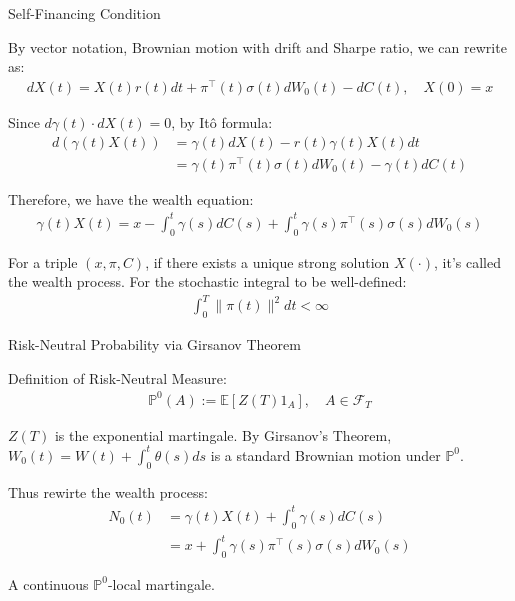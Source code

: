 \documentclass{beamer}
\begin{document}
\begin{frame}{Self-Financing Condition}

    {\footnotesize \footnotesize
    \par By vector notation, Brownian motion with drift and Sharpe ratio, we can rewrite as:
    \begin{align*}
        dX(t) = X(t)r(t)dt + \pi^\top(t)\sigma(t)dW_0(t) - dC(t), \quad X(0) = x
    \end{align*}
    \par Since $d\gamma(t) \cdot dX(t) = 0$, by Itô formula:
    \begin{align*}
        d(\gamma(t)X(t)) &= \gamma(t)dX(t) - r(t)\gamma(t)X(t)dt \\
        &= \gamma(t)\pi^\top(t)\sigma(t)dW_0(t) - \gamma(t)dC(t)
    \end{align*}
    \par Therefore, we have the wealth equation:
    \begin{align*}
        \gamma(t)X(t) = x - \int_0^t \gamma(s)dC(s) + \int_0^t \gamma(s)\pi^\top(s)\sigma(s)dW_0(s)
    \end{align*}
    \par For a triple $(x, \pi, C)$, if there exists a unique strong solution $X(\cdot)$, it's called the wealth process.
    For the stochastic integral to be well-defined:
    \begin{align*}
        \int_{0}^{T} \|\pi(t)\|^{2}  dt < \infty
    \end{align*}
    }   
\end{frame} 

\begin{frame}{Risk-Neutral Probability via Girsanov Theorem}

    {\footnotesize \footnotesize
    \par Definition of Risk-Neutral Measure:
    \begin{align*}
         \mathbb{P}^{0}(A) := \mathbb{E}[Z(T)1_{A}], \quad A \in \mathcal{F}_{T}
    \end{align*}
    \par $Z(T)$ is the exponential martingale. By Girsanov's Theorem, $ W_{0}(t) = W(t) + \int_{0}^{t} \theta(s) ds$ 
    is a standard Brownian motion under $\mathbb{P}^{0}$.
    \par Thus rewirte the wealth process:
    \begin{align*}
         N_{0}(t) &= \gamma(t)X(t) + \int_{0}^{t} \gamma(s)dC(s) \\
    &= x + \int_{0}^{t} \gamma(s)\pi^{\top}(s)\sigma(s) dW_{0}(s)
    \end{align*}
    \par A continuous $\mathbb{P}^{0}$-local martingale.
    }   
\end{frame} 
\end{document}
